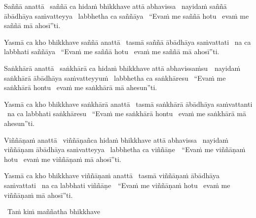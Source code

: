 \begin{pali-hang}
  Saññā anattā \breathmark\ saññā ca hidaṁ bhikkhave attā abhavissa \breathmark\ nayidaṁ saññā ābādhāya saṁvatteyya \breathmark\ labbhetha ca saññāya \breathmark\ ``Evaṁ me saññā hotu \breathmark\ evaṁ me saññā mā ahosī''ti.
\end{pali-hang}

\begin{pali-hang}
  Yasmā ca kho bhikkhave saññā anattā \breathmark\ tasmā saññā ābādhāya saṁvattati \breathmark\ na ca labbhati saññāya \breathmark\ ``Evaṁ me saññā hotu \breathmark\ evaṁ me saññā mā ahosī''ti.
\end{pali-hang}

\begin{pali-hang}
  Saṅkhārā anattā \breathmark\ saṅkhārā ca hidaṁ bhikkhave attā \mbox{abhavissaṁsu}~\breathmark\ nayidaṁ saṅkhārā ābādhāya saṁvatteyyuṁ \breathmark\ labbhetha ca saṅkhāresu \breathmark\ ``Evaṁ me saṅkhārā hontu \breathmark\ evaṁ me saṅkhārā mā ahesun''ti.
\end{pali-hang}

\begin{pali-hang}
  Yasmā ca kho bhikkhave saṅkhārā anattā \breathmark\ tasmā saṅkhārā ābādhāya saṁvattanti \breathmark\ na ca labbhati saṅkhāresu \breathmark\ ``Evaṁ me saṅkhārā hontu \breathmark\ evaṁ me saṅkhārā mā ahesun''ti.
\end{pali-hang}

\begin{pali-hang}
  Viññāṇaṁ anattā \breathmark\ viññāṇañca hidaṁ bhikkhave attā abhavissa \breathmark\ nayidaṁ viññāṇam ābādhāya saṁvatteyya \breathmark\ labbhetha ca \mbox{viññāṇe}~\breathmark\ ``Evaṁ me viññāṇaṁ hotu \breathmark\ evaṁ me viññāṇaṁ mā ahosī''ti.
\end{pali-hang}

\begin{pali-hang}
  Yasmā ca kho bhikkhave viññāṇaṁ anattā \breathmark\ tasmā viññāṇaṁ ābādhāya saṁvattati \breathmark\ na ca labbhati \mbox{viññāṇe}~\breathmark\ ``Evaṁ me viññāṇaṁ hotu \breathmark\ evaṁ me viññāṇaṁ mā ahosī''ti.
\end{pali-hang}

\begin{leader-only}
  \anglebracketleft\ \hspace{-0.5mm}Taṁ kiṁ maññatha bhikkhave \hspace{-0.5mm}\anglebracketright\
\end{leader-only}

